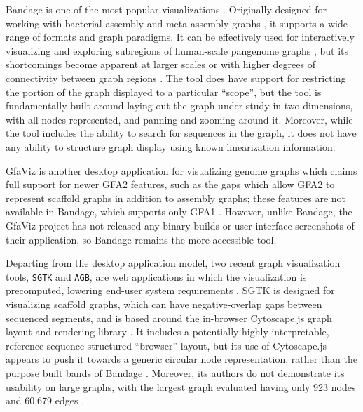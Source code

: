 Bandage \citep{Wick_2015} is one of the most popular visualizations \citep{Mikheenko_2019}.
Originally designed for working with bacterial assembly and meta-assembly graphs \citep{Wick_2015}, it supports a wide range of formats and graph  paradigms.
It can be effectively used for interactively visualizing and exploring subregions of human-scale pangenome graphs \citep{Garrison_2019}, but its shortcomings become apparent at larger scales or with higher degrees of connectivity between graph regions \citep{Mikheenko_2019}.
The tool does have support for restricting the portion of the graph displayed to a particular ``scope'', but the tool is fundamentally built around laying out the graph under study in two dimensions, with all nodes represented, and panning and zooming around it.
Moreover, while the tool includes the ability to search for sequences in the graph, it does not have any ability to structure graph display using known linearization information.

GfaViz is another desktop application for visualizing genome graphs which claims full support for newer GFA2 features, such as the gaps which allow GFA2 to represent scaffold graphs in addition to assembly graphs; these features are not available in Bandage, which supports only GFA1 \citep{Gonnella_2018}.
However, unlike Bandage, the GfaViz project has not released any binary builds or user interface screenshots of their application, so Bandage remains the more accessible tool.

Departing from the desktop application model, two recent graph visualization tools, \texttt{SGTK} and \texttt{AGB}, are web applications in which the visualization is precomputed, lowering end-user system requirements \citep{Kunyavskaya_2018,Mikheenko_2019}.
SGTK is designed for visualizing scaffold graphs, which can have negative-overlap gaps between sequenced segments, and is based around the in-browser Cytoscape.js graph layout and rendering library \citep{Kunyavskaya_2018}.
It includes a potentially highly interpretable, reference sequence structured ``browser'' layout, but its use of Cytoscape.js appears to push it towards a generic circular node representation, rather than the purpose built bands of Bandage \citep{Kunyavskaya_2018}.
Moreover, its authors do not demonstrate its usability on large graphs, with the largest graph evaluated having only 923 nodes and 60,679 edges \citep{Kunyavskaya_2018}.

